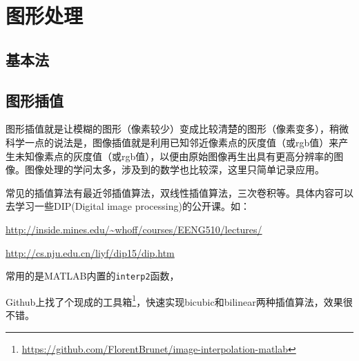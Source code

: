 \section{图形处理}

\subsection{基本法}

\subsection{图形插值}

图形插值就是让模糊的图形（像素较少）变成比较清楚的图形（像素变多），稍微科学一点的说法是，图像插值就是利用已知邻近像素点的灰度值（或rgb值）来产生未知像素点的灰度值（或rgb值），以便由原始图像再生出具有更高分辨率的图像。图像处理的学问太多，涉及到的数学也比较深，这里只简单记录应用。

常见的插值算法有最近邻插值算法，双线性插值算法，三次卷积等。具体内容可以去学习一些DIP(Digital image processing)的公开课。如：

\url{http://inside.mines.edu/~whoff/courses/EENG510/lectures/}

\url{http://cs.nju.edu.cn/liyf/dip15/dip.htm}

常用的是MATLAB内置的\texttt{interp2}函数，

Github上找了个现成的工具箱\footnote{\url{https://github.com/FlorentBrunet/image-interpolation-matlab}}，快速实现bicubic和bilinear两种插值算法，效果很不错。

